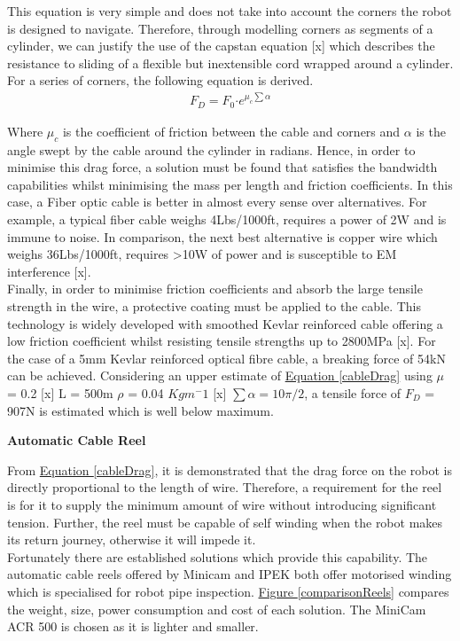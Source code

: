 \documentclass[11pt]{article}		%
\begin{document}
        This equation is very simple and does not take into account the corners the robot is designed to navigate. 
        Therefore, through modelling corners as segments of a cylinder, we can justify the use of the capstan equation [x] which describes the resistance to sliding of a flexible but inextensible cord wrapped around a cylinder. 
        For a series of corners, the following equation is derived.
        \begin{align}
                F_D = F_0 \boldsymbol{\cdot} {e}^{\mu_c \sum \alpha} \label{cableDrag}
        \end{align}

		Where $\mu_c$ is the coefficient of friction between the cable and corners and $\alpha$ is the angle swept by the cable around the cylinder in radians. 
	    Hence, in order to minimise this drag force, a solution must be found that satisfies the bandwidth capabilities whilst minimising the mass per length and friction coefficients.  
	    In this case, a Fiber optic cable is better in almost every sense over alternatives. 
	    For example, a typical fiber cable weighs 4Lbs/1000ft, requires a power of 2W and is immune to noise. 
	    In comparison, the next best alternative is copper wire which weighs 36Lbs/1000ft, requires >10W of power and is susceptible to EM interference [x].
	    \\
	    Finally, in order to minimise friction coefficients and absorb the large tensile strength in the wire, a protective coating must be applied to the cable. 
	    This technology is widely developed with smoothed Kevlar reinforced cable offering a low friction coefficient whilst resisting tensile strengths up to 2800MPa [x]. For the case of a 5mm Kevlar reinforced optical fibre cable, a breaking force of 54kN can be achieved. 
	    Considering an upper estimate of \hyperref[cableDrag]{Equation \ref*{cableDrag}} using $\mu$ = 0.2 [x] L = 500m $\rho$ = 0.04 $Kgm^-1$ [x] $\sum \alpha = 10\pi/2$, a tensile force of $F_D$ = 907N is estimated which is well below maximum. 
	    
	    \textbf{Automatic Cable Reel}

        From \hyperref[cableDrag]{Equation \ref*{cableDrag}}, it is demonstrated that the drag force on the robot is directly proportional to the length of wire. 
        Therefore, a requirement for the reel is for it to supply the minimum amount of wire without introducing significant tension. 
        Further, the reel must be capable of self winding when the robot makes its return journey, otherwise it will impede it.
        \\ 
        \hspace*{3ex}Fortunately there are established solutions which provide this capability. 
        The automatic cable reels offered by Minicam and IPEK both offer motorised winding which is specialised for robot pipe inspection. 
        \hyperref[comparisonReels]{Figure \ref*{comparisonReels}} compares the weight, size, power consumption and cost of each solution. 
        The MiniCam ACR 500 is chosen as it is lighter and smaller. 
\end{document}
